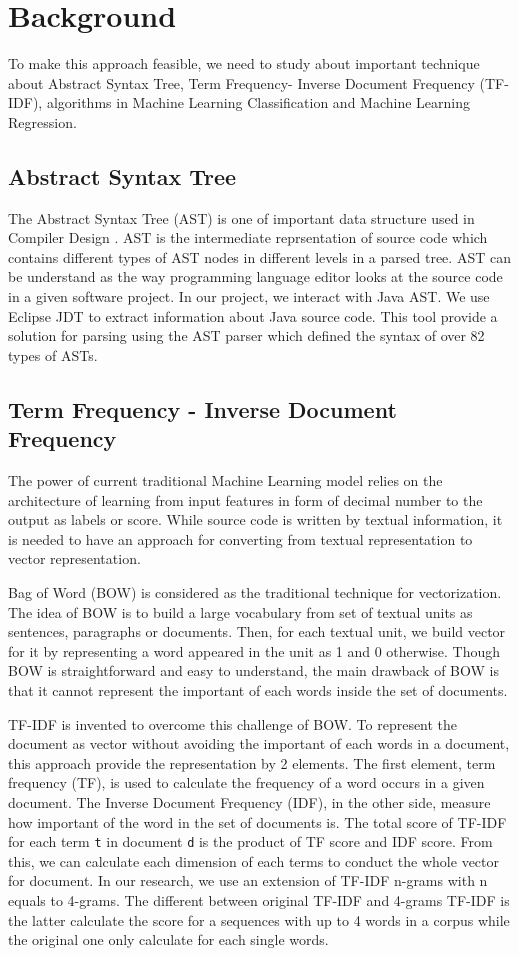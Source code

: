 \section{Background}
To make this approach feasible, we need to study about important technique about Abstract Syntax Tree, Term Frequency- Inverse Document Frequency (TF-IDF), algorithms in Machine Learning Classification and Machine Learning Regression.
\subsection{Abstract Syntax Tree}
The Abstract Syntax Tree (AST) is one of important data structure used in Compiler Design \cite{006}. AST is the intermediate reprsentation of source code which contains different types of AST nodes in different levels in a parsed tree. AST can be understand as the way programming language editor looks at the source code in a given software project. In our project, we interact with Java AST. We use Eclipse JDT \cite{007} to extract information about Java source code. This tool provide a solution for parsing using the AST parser which defined the syntax of over 82 types of ASTs. 
\subsection{Term Frequency - Inverse Document Frequency}
The power of current traditional Machine Learning model relies on the architecture of learning from input features in form of decimal number to the output as labels or score. While source code is written by textual information, it is needed to have an approach for converting from textual representation to vector representation. 

Bag of Word (BOW) \cite{007} is considered as the traditional technique for vectorization. The idea of BOW is to build a large vocabulary from set of textual units as sentences, paragraphs or documents. Then, for each textual unit, we build vector for it by representing a word appeared in the unit as 1 and 0 otherwise. Though BOW is straightforward and easy to understand, the main drawback of BOW is that it cannot represent the important of each words inside the set of documents.

TF-IDF \cite{008} is invented to overcome this challenge of BOW. To represent the document as vector without avoiding the important of each words in a document, this approach provide the representation by 2 elements. The first element, term frequency (TF), is used to calculate the frequency of a word occurs in a given document. The Inverse Document Frequency (IDF), in the other side, measure how important of the word in the set of documents is. The total score of TF-IDF for each term \texttt{t} in document \texttt{d} is the product of TF score and IDF score. From this, we can calculate each dimension of each terms to conduct the whole vector for document.
In our research, we use an extension of TF-IDF n-grams with n equals to 4-grams. The different between original TF-IDF and 4-grams TF-IDF is the latter calculate the score for a sequences with up to 4 words in a corpus while the original one only calculate for each single words.


